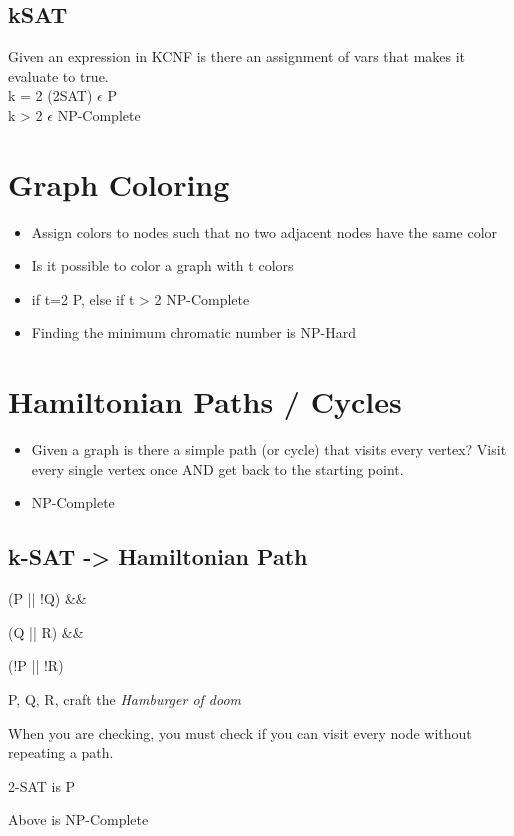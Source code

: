 \documentclass{article}
\begin{document}
\subsection{kSAT}
\label{sec:org34e09bc}
Given an expression in KCNF is there an assignment of vars that makes it evaluate to true. \\
k = 2 (2SAT) \(\epsilon\) P \\
k > 2 \(\epsilon\) NP-Complete

\section{Graph Coloring}
\label{sec:orgfcf098a}
\begin{itemize}
\item Assign colors to nodes such that no two adjacent nodes have the same color
\item Is it possible to color a graph with t colors
\item if t=2 P, else if t > 2 NP-Complete
\item Finding the minimum chromatic number is NP-Hard
\end{itemize}

\section{Hamiltonian Paths / Cycles}
\label{sec:org2a75dfc}
\begin{itemize}
\item Given a graph is there a simple path (or cycle) that visits every vertex? Visit every single vertex once AND get back to the starting point.
\item NP-Complete
\end{itemize}
\subsection{k-SAT -> Hamiltonian Path}
\label{sec:org37d850f}
\begin{description}
\item[{E1}] (P || !Q) \&\&
\item[{E2}] (Q || R) \&\&
\item[{E3}] (!P || !R)
\item P, Q, R, craft the \emph{Hamburger of doom}
\item When you are checking, you must check if you can visit every node without repeating a path.
\item 2-SAT is P
\item Above is NP-Complete
\end{description}
\end{document}
